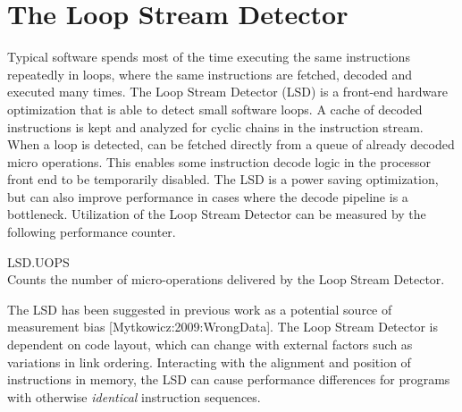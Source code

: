 \documentclass[a4paper,10pt,twocolumn,twoside]{article}
\begin{document}
\section{The Loop Stream Detector}
Typical software spends most of the time executing the same instructions repeatedly in loops, where the same instructions are fetched, decoded and executed many times. 
The Loop Stream Detector (LSD) is a front-end hardware optimization that is able to detect small software loops.
A cache of decoded instructions is kept and analyzed for cyclic chains in the instruction stream.
When a loop is detected, can be fetched directly from a queue of already decoded micro operations.
This enables some instruction decode logic in the processor front end to be temporarily disabled.
The LSD is a power saving optimization, but can also improve performance in cases where the decode pipeline is a bottleneck.
Utilization of the Loop Stream Detector can be measured by the following performance counter.
\begin{description}
  \item{LSD.UOPS} \hfill \\
  Counts the number of micro-operations delivered by the Loop Stream Detector.
\end{description}

The LSD has been suggested in previous work as a potential source of measurement bias [Mytkowicz:2009:WrongData].
The Loop Stream Detector is dependent on code layout, which can change with external factors such as variations in link ordering. 
Interacting with the alignment and position of instructions in memory, the LSD can cause performance differences for programs with otherwise \emph{identical} instruction sequences.
\end{document}
